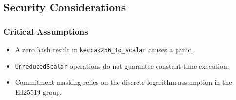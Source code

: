 \documentclass[12pt,a4paper]{article}
\begin{document}
\subsection{Security Considerations}

\subsubsection{Critical Assumptions}
\begin{itemize}
  \item A zero hash result in \texttt{keccak256\_to\_scalar} causes a panic.  %
  \item \texttt{UnreducedScalar} operations do not guarantee constant-time execution.  %
  \item Commitment masking relies on the discrete logarithm assumption in the Ed25519 group.  %
\end{itemize}
\end{document}
